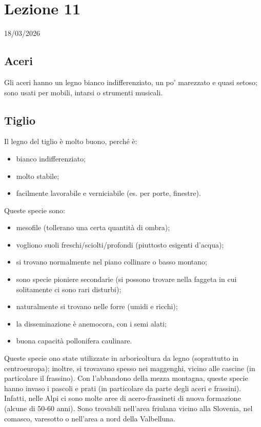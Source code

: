 \section{Lezione 11} \hfill 18/03/2026
\subsection{Aceri}
Gli aceri hanno un legno bianco indifferenziato, un po' marezzato e quasi setoso; sono usati per mobili, intarsi o strumenti musicali.
\subsection{Tiglio}
Il legno del tiglio è molto buono, perché è:
\begin{itemize}[nosep]
    \item bianco indifferenziato;
    \item molto stabile;
    \item facilmente lavorabile e verniciabile (es. per porte, finestre).
\end{itemize}
Queste specie sono: 
\begin{itemize}[nosep]
    \item mesofile (tollerano una certa quantità di ombra);
    \item vogliono suoli freschi/sciolti/profondi (piuttosto esigenti d'acqua);
    \item si trovano normalmente nel piano collinare o basso montano; 
    \item sono specie pioniere secondarie (si possono trovare nella faggeta in cui solitamente ci sono rari disturbi);
    \item naturalmente si trovano nelle forre (umidi e ricchi);
    \item la disseminazione è anemocora, con i semi alati;
    \item buona capacità pollonifera caulinare.
\end{itemize}
Queste specie ono state utilizzate in arboricoltura da legno (soprattutto in centroeuropa); inoltre, si trovavano spesso nei maggenghi, vicino alle cascine (in particolare il frassino). Con l'abbandono della mezza montagna, queste specie hanno invaso i pascoli e prati (in particolare da parte degli aceri e frassini).\\
Infatti, nelle Alpi ci sono molte aree di acero-frassineti di nuova formazione (alcune di 50-60 anni). Sono trovabili nell'area friulana vicino alla Slovenia, nel comasco, varesotto o nell'area a nord della Valbelluna. \\
